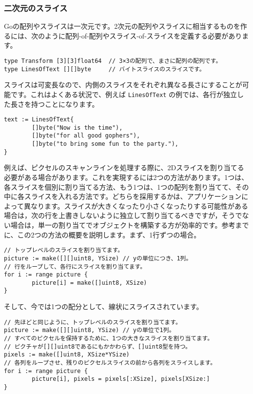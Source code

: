 \documentclass{jsarticle}
\begin{document}
\subsubsection{二次元のスライス}

Goの配列やスライスは一次元です。2次元の配列やスライスに相当するものを作るには、次のように配列-of-配列やスライス-of-スライスを定義する必要があります。

\begin{lstlisting}[numbers=none]
type Transform [3][3]float64  // 3×3の配列で、まさに配列の配列です。
type LinesOfText [][]byte     // バイトスライスのスライスです。
\end{lstlisting}

スライスは可変長なので、内側のスライスをそれぞれ異なる長さにすることが可能です。これはよくある状況で、例えば
\texttt{LinesOfText} の例では、各行が独立した長さを持つことになります。

\begin{lstlisting}[numbers=none]
text := LinesOfText{
        []byte("Now is the time"),
        []byte("for all good gophers"),
        []byte("to bring some fun to the party."),
}
\end{lstlisting}

例えば、ピクセルのスキャンラインを処理する際に、2Dスライスを割り当てる必要がある場合があります。これを実現するには2つの方法があります。1つは、各スライスを個別に割り当てる方法、もう1つは、1つの配列を割り当てて、その中に各スライスを入れる方法です。どちらを採用するかは、アプリケーションによって異なります。スライスが大きくなったり小さくなったりする可能性がある場合は，次の行を上書きしないように独立して割り当てるべきですが，そうでない場合は，単一の割り当てでオブジェクトを構築する方が効率的です。参考までに、この2つの方法の概要を説明します。まず、1行ずつの場合。

\begin{lstlisting}[numbers=none]
// トップレベルのスライスを割り当てます。
picture := make([][]uint8, YSize) // yの単位につき、1列。
// 行をループして、各行にスライスを割り当てます。
for i := range picture {
        picture[i] = make([]uint8, XSize)
}
\end{lstlisting}

そして、今では1つの配分として、線状にスライスされています。

\begin{lstlisting}[numbers=none]
// 先ほどと同じように、トップレベルのスライスを割り当てます。
picture := make([][]uint8, YSize) // yの単位で1列。
// すべてのピクセルを保持するために、1つの大きなスライスを割り当てます。
// ピクチャが[][]uint8であるにもかかわらず、[]uint8型を持つ。
pixels := make([]uint8, XSize*YSize) 
// 各列をループさせ、残りのピクセルスライスの前から各列をスライスします。
for i := range picture {
        picture[i], pixels = pixels[:XSize], pixels[XSize:]
}
\end{lstlisting}
\end{document}
